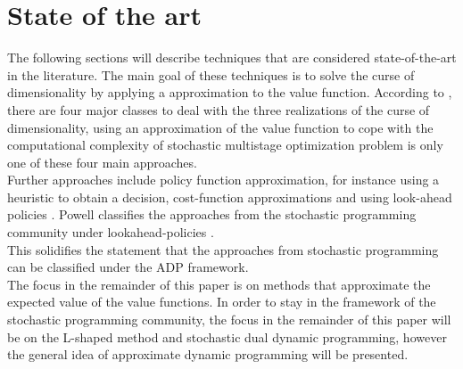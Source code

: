 \section{State of the art} \label{State of the art}
The following sections will describe techniques that are considered state-of-the-art in the literature. 
The main goal of these techniques is to solve the curse of dimensionality by applying a approximation to the value function.
According to \cite{POWELL2019795}, there are four major classes to deal with the three realizations of the curse of dimensionality, using an approximation of the value function to cope with the computational complexity of stochastic multistage optimization problem is only one of these four main approaches. \\
Further approaches include policy function approximation, for instance using a heuristic to obtain a decision, cost-function approximations and using look-ahead policies \cite{POWELL2019795}. 
Powell classifies the approaches from the stochastic programming community under lookahead-policies \cite{POWELL2019795}. \\
This solidifies the statement that the approaches from stochastic programming can be classified under the ADP framework. \\
The focus in the remainder of this paper is on methods that approximate the expected value of the value functions.
In order to stay in the framework of the stochastic programming community, the focus in the remainder of this paper will be on the L-shaped method and stochastic dual dynamic programming, however the general idea of approximate dynamic programming will be presented.


